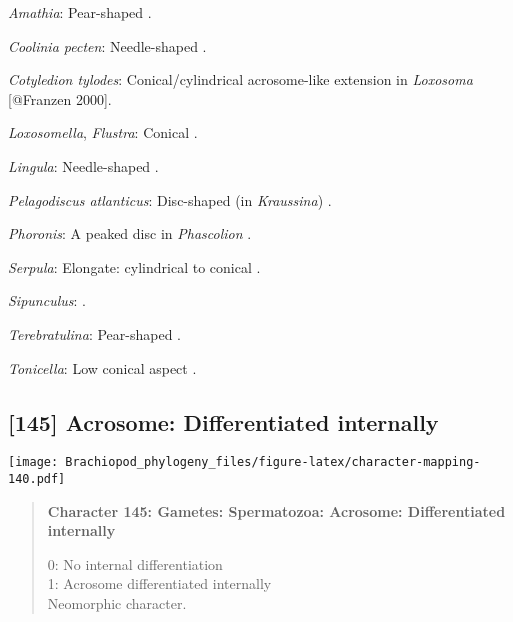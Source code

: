 \documentclass[openany]{book}
\theoremstyle{definition}
\theoremstyle{definition}
\theoremstyle{definition}
\theoremstyle{remark}
\begin{document}
\hypertarget{Amathia-coding-144}{}
\emph{Amathia}: Pear-shaped \citep{Hodgson1994Ultrastructureof}.

\hypertarget{Coolinia_pecten-coding-144}{}
\emph{Coolinia pecten}: Needle-shaped \citep{Afzelius1978Finestructure}.

\hypertarget{Cotyledion_tylodes-coding-144}{}
\emph{Cotyledion tylodes}: Conical/cylindrical acrosome-like extension
in \emph{Loxosoma} {[}@Franzen 2000{]}.

\hypertarget{Flustra-coding-144}{}
\emph{Loxosomella}, \emph{Flustra}: Conical \citep[in
\emph{Tubulipora};][]{Franzen1984}.

\hypertarget{Lingula-coding-144}{}
\emph{Lingula}: Needle-shaped \citep{Reunov2004Ultrastructuralstudy}.

\hypertarget{Pelagodiscus_atlanticus-coding-144}{}
\emph{Pelagodiscus atlanticus}: Disc-shaped (in \emph{Kraussina})
\citep{Hodgson1994Ultrastructureof}.

\hypertarget{Phoronis-coding-144}{}
\emph{Phoronis}: A peaked disc in \emph{Phascolion} \citep{Rice1993}.

\hypertarget{Serpula-coding-144}{}
\emph{Serpula}: Elongate: cylindrical to conical
\citep{BucklandNicks1988}.

\hypertarget{Sipunculus-coding-144}{}
\emph{Sipunculus}: \citet{Gherardi2011}.

\hypertarget{Terebratulina-coding-144}{}
\emph{Terebratulina}: Pear-shaped \citep{Fukumoto2003Theacrosome}.

\hypertarget{Tonicella-coding-144}{}
\emph{Tonicella}: Low conical aspect \citep{DufresneDube1983}.

\subsection*{{[}145{]} Acrosome: Differentiated
internally}\label{acrosome-differentiated-internally}

\texttt{[image: Brachiopod\_phylogeny\_files/figure-latex/character-mapping-140.pdf]}

\begin{quote}
\textbf{Character 145: Gametes: Spermatozoa: Acrosome: Differentiated
internally}

0: No internal differentiation\\
1: Acrosome differentiated internally\\
Neomorphic character.
\end{quote}
\end{document}

